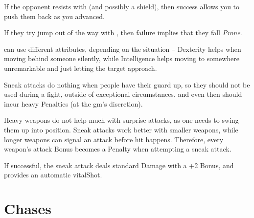 \begin{multicols}{2}
If the opponent resists with  (and possibly a shield), then success allows you to push them back as you advanced.

If they try jump out of the way with , then failure implies that they fall \textit{Prone}.

\label{sneakattack}
can use different \glspl{attribute}, depending on the situation -- Dexterity helps when moving behind someone silently, while Intelligence helps moving to somewhere unremarkable and just letting the target approach.

Sneak attacks do nothing when people have their guard up, so they should not be used during a fight, outside of exceptional circumstances, and even then should incur heavy Penalties (at the \gls{gm}'s discretion).

Heavy weapons do not help much with surprise attacks, as one needs to swing them up into position.
Sneak attacks work better with smaller weapons, while longer weapons can signal an attack before hit happens.
Therefore, every weapon's attack Bonus becomes a Penalty when attempting a sneak attack.

If successful, the sneak attack deals standard Damage with a +2 Bonus, and provides an automatic \gls{vitalShot}.

\stopcontents[Manoeuvres]

\end{multicols}

\section{Chases}
\label{chases}

\chasechart

